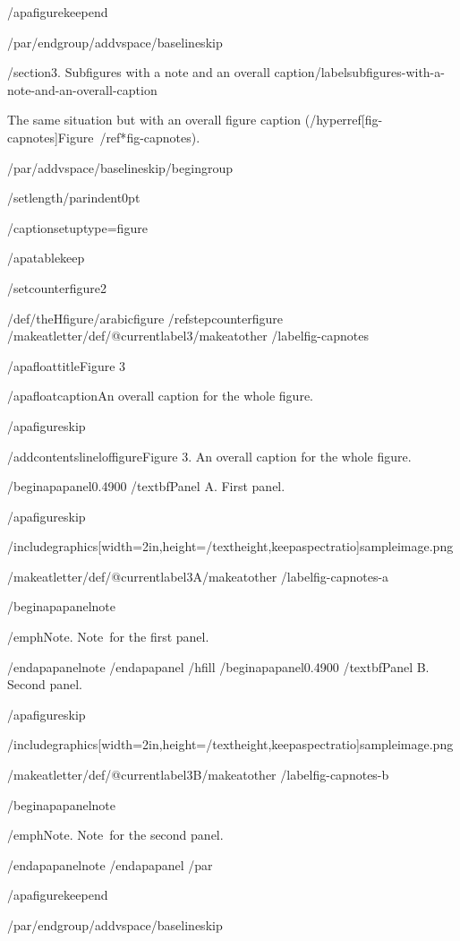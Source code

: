 /apafigurekeepend

/par/endgroup/addvspace{/baselineskip}

/section{3. Subfigures with a note and an overall
caption}/label{subfigures-with-a-note-and-an-overall-caption}

The same situation but with an overall figure caption
(/hyperref[fig-capnotes]{Figure~/ref*{fig-capnotes}}).

/par/addvspace{/baselineskip}/begingroup

/setlength{/parindent}{0pt}

/captionsetup{type=figure}

/apatablekeep

/setcounter{figure}{2}

/def/theHfigure{/arabic{figure}}%
/refstepcounter{figure}%
/makeatletter/def/@currentlabel{3}/makeatother%
/label{fig-capnotes}

/apafloattitle{Figure 3}

/apafloatcaption{An overall caption for the whole figure.}

/apafigureskip

/addcontentsline{lof}{figure}{Figure 3. An overall caption for the whole
figure.}

/begin{apapanel}{0.4900}%
/textbf{Panel A}. First panel.

/apafigureskip

/includegraphics[width=2in,height=/textheight,keepaspectratio]{sampleimage.png}

/makeatletter/def/@currentlabel{3A}/makeatother%
/label{fig-capnotes-a}

/begin{apapanelnote}

/emph{Note}. Note~for the first panel.

/end{apapanelnote}
/end{apapanel}%
/hfill
/begin{apapanel}{0.4900}%
/textbf{Panel B}. Second panel.

/apafigureskip

/includegraphics[width=2in,height=/textheight,keepaspectratio]{sampleimage.png}

/makeatletter/def/@currentlabel{3B}/makeatother%
/label{fig-capnotes-b}

/begin{apapanelnote}

/emph{Note}. Note~for the second panel.

/end{apapanelnote}
/end{apapanel}%
/par

/apafigurekeepend

/par/endgroup/addvspace{/baselineskip}

